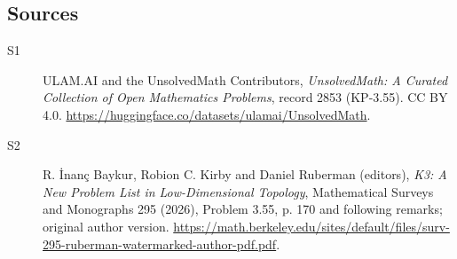 \documentclass[11pt]{article}
\begin{document}
\subsection{Sources}
\begin{description}
\item[\hypertarget{source:2853:1}{S1}] ULAM.AI and the UnsolvedMath Contributors, \emph{UnsolvedMath: A Curated Collection of Open Mathematics Problems}, record 2853 (KP-3.55). CC BY 4.0. \url{https://huggingface.co/datasets/ulamai/UnsolvedMath}.
\item[\hypertarget{source:2853:2}{S2}] R. İnanç Baykur, Robion C. Kirby and Daniel Ruberman (editors), \emph{K3: A New Problem List in Low-Dimensional Topology}, Mathematical Surveys and Monographs 295 (2026), Problem 3.55, p. 170 and following remarks; original author version. \url{https://math.berkeley.edu/sites/default/files/surv-295-ruberman-watermarked-author-pdf.pdf}.
\end{description}
\label{end:2853}
\end{document}
